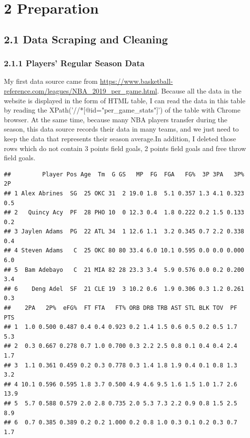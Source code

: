 \documentclass[]{article}
\begin{document}
\section{2 Preparation}\label{preparation}

\subsection{2.1 Data Scraping and
Cleaning}\label{data-scraping-and-cleaning}

\subsubsection{2.1.1 Players' Regular Season
Data}\label{players-regular-season-data}

My first data source came from
\url{https://www.basketball-reference.com/leagues/NBA_2019_per_game.html}.
Because all the data in the website is displayed in the form of HTML
table, I can read the data in this table by reading the
XPath('//*{[}@id="per\_game\_stats"{]}') of the table with Chrome
browser. At the same time, because many NBA players transfer during the
season, this data source records their data in many teams, and we just
need to keep the data that represents their season average.In addition,
I deleted those rows which do not contain 3 points field goals, 2 points
field goals and free throw field goals.

\begin{verbatim}
##         Player Pos Age  Tm  G GS   MP  FG  FGA   FG%  3P 3PA   3P%  2P
## 1 Alex Abrines  SG  25 OKC 31  2 19.0 1.8  5.1 0.357 1.3 4.1 0.323 0.5
## 2   Quincy Acy  PF  28 PHO 10  0 12.3 0.4  1.8 0.222 0.2 1.5 0.133 0.2
## 3 Jaylen Adams  PG  22 ATL 34  1 12.6 1.1  3.2 0.345 0.7 2.2 0.338 0.4
## 4 Steven Adams   C  25 OKC 80 80 33.4 6.0 10.1 0.595 0.0 0.0 0.000 6.0
## 5  Bam Adebayo   C  21 MIA 82 28 23.3 3.4  5.9 0.576 0.0 0.2 0.200 3.4
## 6    Deng Adel  SF  21 CLE 19  3 10.2 0.6  1.9 0.306 0.3 1.2 0.261 0.3
##    2PA   2P%  eFG%  FT FTA   FT% ORB DRB TRB AST STL BLK TOV  PF  PTS
## 1  1.0 0.500 0.487 0.4 0.4 0.923 0.2 1.4 1.5 0.6 0.5 0.2 0.5 1.7  5.3
## 2  0.3 0.667 0.278 0.7 1.0 0.700 0.3 2.2 2.5 0.8 0.1 0.4 0.4 2.4  1.7
## 3  1.1 0.361 0.459 0.2 0.3 0.778 0.3 1.4 1.8 1.9 0.4 0.1 0.8 1.3  3.2
## 4 10.1 0.596 0.595 1.8 3.7 0.500 4.9 4.6 9.5 1.6 1.5 1.0 1.7 2.6 13.9
## 5  5.7 0.588 0.579 2.0 2.8 0.735 2.0 5.3 7.3 2.2 0.9 0.8 1.5 2.5  8.9
## 6  0.7 0.385 0.389 0.2 0.2 1.000 0.2 0.8 1.0 0.3 0.1 0.2 0.3 0.7  1.7
\end{verbatim}
\end{document}
